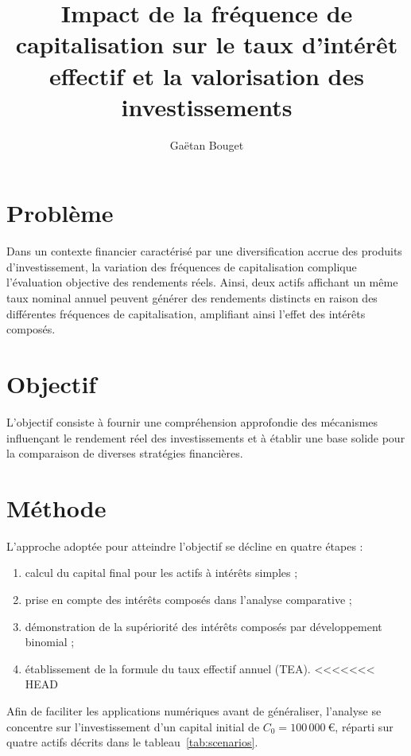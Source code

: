 \documentclass{article}
\title{Impact de la fréquence de capitalisation sur le taux d'intérêt effectif et la valorisation des investissements}
\author{Gaëtan Bouget}
\begin{document}
\maketitle

\section{Problème}
    Dans un contexte financier caractérisé par une diversification accrue des produits d’investissement, la variation des fréquences de capitalisation complique l’évaluation objective des rendements réels. Ainsi, deux actifs affichant un même taux nominal annuel peuvent générer des rendements distincts en raison des différentes fréquences de capitalisation, amplifiant ainsi l'effet des intérêts composés.

\section{Objectif}
    L'objectif consiste à fournir une compréhension approfondie des mécanismes influençant le rendement réel des investissements et à établir une base solide pour la comparaison de diverses stratégies financières.

\section{Méthode}
    L'approche adoptée pour atteindre l'objectif se décline en quatre étapes :
    \begin{enumerate}
    \item calcul du capital final pour les actifs à intérêts simples ;
    \item prise en compte des intérêts composés dans l’analyse comparative ;
    \item démonstration de la supériorité des intérêts composés par développement binomial ;
    \item établissement de la formule du taux effectif annuel (TEA).
<<<<<<< HEAD
    \end{enumerate}

    Afin de faciliter les applications numériques avant de généraliser, l'analyse se concentre sur l'investissement d'un capital initial de \( C_0 = 100\,000\ \text{€} \), réparti sur quatre actifs décrits dans le tableau~\ref{tab:scenarios}.
\end{document}
